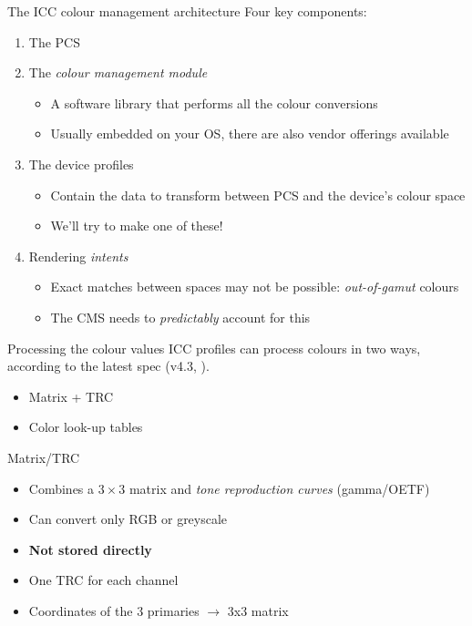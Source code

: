 \documentclass[aspectratio=169]{fireshonks}
\begin{document}
\begin{frame}{The ICC colour management architecture}
  Four key components:
  \begin{enumerate}[<+(1)->]
    \item The PCS
    \item The \emph{colour management module}
          \begin{itemize}
            \item A software library that performs all the colour conversions
            \item Usually embedded on your OS, there are also vendor offerings available
          \end{itemize}
    \item The device profiles
          \begin{itemize}
            \item Contain the data to transform between PCS and the device's colour space
            \item {} We'll try to make one of these!
          \end{itemize}
    \item Rendering \emph{intents}
          \begin{itemize}
            \item Exact matches between spaces may not be possible: \emph{out-of-gamut} colours
            \item The CMS needs to \emph{predictably} account for this
          \end{itemize}
  \end{enumerate}
\end{frame}
\begin{frame}{Processing the colour values}
  ICC profiles can process colours in two ways, according to the latest spec (v4.3, \cite*{icc}).
  \begin{itemize}[<+(1)->]
    \item Matrix + TRC
    \item Color look-up tables
  \end{itemize}
\end{frame}
\begin{frame}{Matrix/TRC}
  \begin{itemize}
    \item Combines a $3\times3$ matrix and \emph{tone reproduction curves}
          (gamma/OETF)
    \item Can convert only RGB or greyscale
    \item \textbf{Not stored directly}
    \item One TRC for each channel
    \item Coordinates of the 3 primaries $\rightarrow$ 3x3 matrix
  \end{itemize}
\end{frame}
\end{document}
